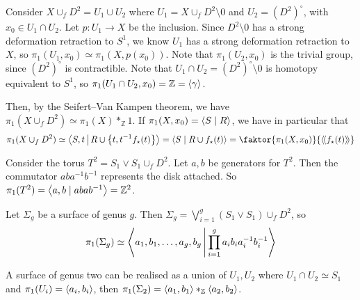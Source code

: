 \begin{example}
	Consider \( X \cup_f D^2 = U_1 \cup U_2 \) where \( U_1 = X \cup_f D^2 \setminus \qty{0} \) and \( U_2 = (D^2)^\circ \), with \( x_0 \in U_1 \cap U_2 \).
	Let \( p \colon U_1 \to X \) be the inclusion.
	Since \( D^2 \setminus \qty{0} \) has a strong deformation retraction to \( S^1 \), we know \( U_1 \) has a strong deformation retraction to \( X \), so \( \pi_1(U_1,x_0) \simeq \pi_1(X,p(x_0)) \).
	Note that \( \pi_1(U_2,x_0) \) is the trivial group, since \( (D^2)^\circ \) is contractible.
	Note that \( U_1 \cap U_2 = (D^2)^\circ \setminus \qty{0} \) is homotopy equivalent to \( S^1 \), so \( \pi_1(U_1 \cap U_2,x_0) = \mathbb Z = \left\langle{} \gamma \right\rangle \).

	Then, by the Seifert--Van Kampen theorem, we have \( \pi_1(X \cup_f D^2) \simeq \pi_1(X) \ast_{\mathbb Z} 1 \).
	If \( \pi_1(X,x_0) = \left\langle{} S \mid R \right\rangle \), we have in particular that
	\[ \pi_1(X \cup_f D^2) \simeq \genset{S, t \midd R \cup \qty{t, t^{-1}f_\star(t)}} = \genset{S \mid R \cup{f_\star(t)}} = \faktor{\pi_1(X,x_0)}{\ngenset{f_\star(t)}} \]
\end{example}
\begin{example}
	Consider the torus \( T^2 = S_1 \vee S_1 \cup_f D^2 \).
	Let \( a, b \) be generators for \( T^2 \).
	Then the commutator \( aba^{-1}b^{-1} \) represents the disk attached.
	So \( \pi_1(T^2) = \left\langle{} a, b \mid abab^{-1} \right\rangle = \mathbb Z^2 \).
\end{example}
\begin{example}
	Let \( \Sigma_g \) be a surface of genus \( g \).
	Then \( \Sigma_g = \bigvee_{i=1}^g (S_1 \vee S_1) \cup_f D^2 \), so
	\[ \pi_1(\Sigma_g) \simeq \left\langle{} a_1,b_1,\dots, a_g, b_g \,\middle|\, \prod_{i=1}^g a_i b_i a_i^{-1} b_i^{-1} \right\rangle \]
\end{example}
\begin{example}
	A surface of genus two can be realised as a union of \( U_1, U_2 \) where \( U_1 \cap U_2 \simeq S_1 \) and \( \pi_1(U_i) = \left\langle{} a_i,b_i \right\rangle \), then \( \pi_1(\Sigma_2) = \left\langle{} a_1,b_1 \right\rangle \ast_{\mathbb Z} \left\langle{} a_2,b_2 \right\rangle \).
\end{example}
